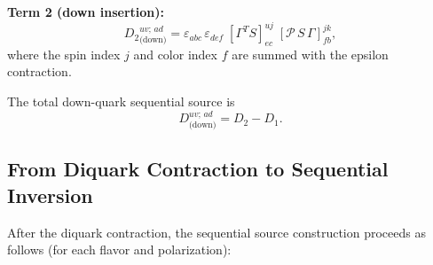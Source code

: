 \documentclass[11pt,a4paper]{article}
\newcommand{\eps}{\varepsilon}
\newcommand{\PolProj}{\mathcal{P}}
\newcommand{\fwprop}{S}
\begin{document}
\medskip\noindent
\textbf{Term 2 (down insertion):}
\begin{equation}
  \boxed{
  {D_{2}}^{uv;\,ad}_{\text{(down)}} =
  \eps_{abc}\,\eps_{def}\;
  [\Gamma^{T}\fwprop]^{uj}_{ec}\;
  [\PolProj\,\fwprop\,\Gamma]^{jk}_{fb},
  }
  \label{eq:Ddown2}
\end{equation}
where the spin index $j$ and color index $f$ are summed with the epsilon
contraction.

\medskip\noindent
The total down-quark sequential source is
\begin{equation}
  \boxed{
  D_{\text{(down)}}^{uv;\,ad} = D_{2} - D_{1}.
  }
  \label{eq:Ddown_total}
\end{equation}

\subsection{From Diquark Contraction to Sequential Inversion}

After the diquark contraction, the sequential source construction proceeds as
follows (for each flavor and polarization):
\end{document}
